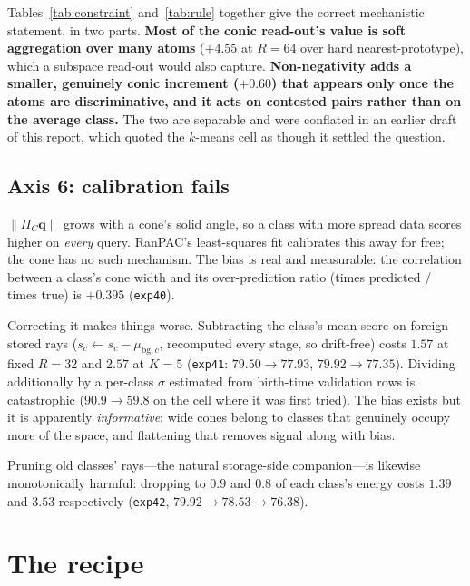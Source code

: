 \documentclass[10pt,twocolumn]{article}
\newcommand{\bq}{\mathbf{q}}
\begin{document}
Tables~\ref{tab:constraint} and~\ref{tab:rule} together give the correct
mechanistic statement, in two parts. \textbf{Most of the conic read-out's value
is soft aggregation over many atoms} ($+4.55$ at $R{=}64$ over hard
nearest-prototype), which a subspace read-out would also capture.
\textbf{Non-negativity adds a smaller, genuinely conic increment ($+0.60$) that
appears only once the atoms are discriminative, and it acts on contested pairs
rather than on the average class.} The two are separable and were conflated in
an earlier draft of this report, which quoted the $k$-means cell as though it
settled the question.

\subsection{Axis 6: calibration fails}

$\lVert\Pi_C\bq\rVert$ grows with a cone's solid angle, so a class with more
spread data scores higher on \emph{every} query. RanPAC's least-squares fit
calibrates this away for free; the cone has no such mechanism. The bias is real
and measurable: the correlation between a class's cone width and its
over-prediction ratio (times predicted / times true) is $+0.395$
(\texttt{exp40}).

Correcting it makes things worse. Subtracting the class's mean score on foreign
stored rays ($s_c\leftarrow s_c-\mu_{\text{bg},c}$, recomputed every stage, so
drift-free) costs $1.57$ at fixed $R{=}32$ and $2.57$ at $K{=}5$
(\texttt{exp41}: $79.50\to77.93$, $79.92\to77.35$). Dividing additionally by a
per-class $\sigma$ estimated from birth-time validation rows is catastrophic
($90.9\to59.8$ on the cell where it was first tried). The bias exists but it is
apparently \emph{informative}: wide cones belong to classes that genuinely
occupy more of the space, and flattening that removes signal along with bias.

Pruning old classes' rays---the natural storage-side companion---is likewise
monotonically harmful: dropping to $0.9$ and $0.8$ of each class's energy costs
$1.39$ and $3.53$ respectively (\texttt{exp42}, $79.92\to78.53\to76.38$).

\section{The recipe}
\end{document}
